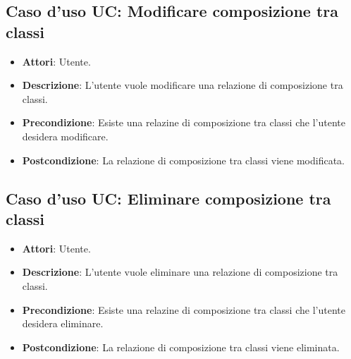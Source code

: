 \documentclass[../AnalisiDeiRequisiti.tex]{subfiles}
\begin{document}
		\subsection{Caso d'uso UC:  Modificare composizione tra classi}
		\begin{itemize}
			\item\textbf{Attori}: Utente.
			\item\textbf{Descrizione}: L'utente vuole modificare una relazione di composizione tra classi.
			\item\textbf{Precondizione}: Esiste una relazine di composizione tra classi che l'utente desidera modificare.
			\item\textbf{Postcondizione}: La relazione di composizione tra classi viene modificata.
		\end{itemize}
		
		\subsection{Caso d'uso UC: Eliminare composizione tra classi}
		\begin{itemize}
			\item\textbf{Attori}: Utente.
			\item\textbf{Descrizione}: L'utente vuole eliminare una relazione di composizione tra classi.
			\item\textbf{Precondizione}: Esiste una relazine di composizione tra classi che l'utente desidera eliminare.
			\item\textbf{Postcondizione}: La relazione di composizione tra classi viene eliminata.
		\end{itemize}
		
\end{document}
